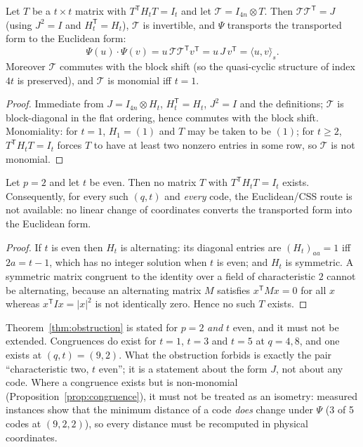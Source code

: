 \begin{proposition}\label{prop:congruence}
Let $T$ be a $t\times t$ matrix with $T^{\mathsf T}H_tT=I_t$ and let
$\mathcal T=I_{4n}\otimes T$. Then $\mathcal T\mathcal T^{\mathsf T}=J$ (using
$J^2=I$ and $H_t^{\mathsf T}=H_t$), $\mathcal T$ is invertible, and $\Psi$
transports the transported form to the Euclidean form:
\[
  \Psi(u)\cdot\Psi(v)=u\,\mathcal T\mathcal T^{\mathsf T}v^{\mathsf T}
  =u\,J\,v^{\mathsf T}=\langle u,v\rangle^{\widehat{}}_s .
\]
Moreover $\mathcal T$ commutes with the block shift (so the quasi-cyclic
structure of index $4t$ is preserved), and $\mathcal T$ is monomial iff $t=1$.
\end{proposition}

\begin{proof}
Immediate from $J=I_{4n}\otimes H_t$, $H_t^{\mathsf T}=H_t$, $J^2=I$ and the
definitions; $\mathcal T$ is block-diagonal in the flat ordering, hence commutes
with the block shift. Monomiality: for $t=1$, $H_1=(1)$ and $T$ may be taken to
be $(1)$; for $t\ge2$, $T^{\mathsf T}H_tT=I_t$ forces $T$ to have at least two
nonzero entries in some row, so $\mathcal T$ is not monomial.
\end{proof}

\begin{theorem}\label{thm:obstruction}
Let $p=2$ and let $t$ be even. Then no matrix $T$ with
$T^{\mathsf T}H_tT=I_t$ exists. Consequently, for every such $(q,t)$ and
\emph{every} code, the Euclidean/CSS route is not available: no linear change of
coordinates converts the transported form into the Euclidean form.
\end{theorem}

\begin{proof}
If $t$ is even then $H_t$ is alternating: its diagonal entries are
$(H_t)_{aa}=1$ iff $2a=t-1$, which has no integer solution when $t$ is even;
and $H_t$ is symmetric. A symmetric matrix congruent to the identity over a
field of characteristic $2$ cannot be alternating, because an alternating
matrix $M$ satisfies $x^{\mathsf T}Mx=0$ for all $x$ whereas
$x^{\mathsf T}Ix=|x|^2$ is not identically zero. Hence no such $T$ exists.
\end{proof}

\begin{remark}\label{rem:obstructionexact}
Theorem~\ref{thm:obstruction} is stated for $p=2$ \emph{and} $t$ even, and it
must not be extended. Congruences do exist for $t=1$, $t=3$ and $t=5$ at
$q=4,8$, and one exists at $(q,t)=(9,2)$. What the obstruction forbids is
exactly the pair ``characteristic two, $t$ even''; it is a statement about the
form $J$, not about any code. Where a congruence exists but is non-monomial
(Proposition~\ref{prop:congruence}), it must not be treated as an isometry:
measured instances show that the minimum distance of a code \emph{does} change
under $\Psi$ (3 of 5 codes at $(9,2,2)$), so every distance must be recomputed
in physical coordinates.
\end{remark}

